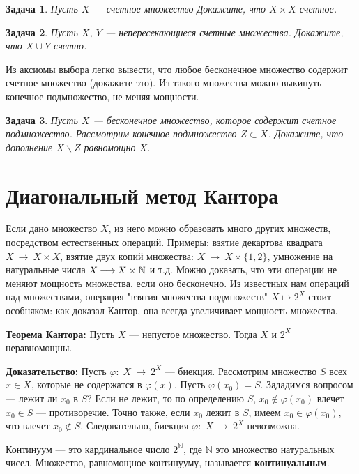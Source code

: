 \documentclass[12pt]{book}
\newcommand{\arrow}{{\:\longrightarrow\:}}
\def\endproof{\hbox{\vrule width 5pt height 5pt depth 0pt}}
\renewcommand{\phi}{\varphi}
\def\N{{\mathbb N}}
\theoremstyle{upshape}
\newtheorem{zadacha}{Задача}[chapter]
\theoremstyle{generic}
\newtheorem{remark}[teorema]{Замечание}
\def\замечание{\begin{remark}}
\def\еза{\end{remark}}
\theoremstyle{upshapenonumber}
\newcommand{\следствие}{%
     \refstepcounter{teorema}
     {\noindent\bf Следствие \thechapter.\arabic{teorema}:\ }}
\newcommand{\пример}{%
     \refstepcounter{teorema}
     {\noindent\bf Пример \thechapter.\arabic{teorema}:\ }}
\newcommand{\лемма}{%
     \refstepcounter{teorema}
     {\noindent\bf Лемма \thechapter.\arabic{teorema}:\ }}
\newcommand{\теорема}{%
     \refstepcounter{teorema}
     {\noindent\bf Теорема \thechapter.\arabic{teorema}:\ }}
\newcommand{\утверждение}{%
     \refstepcounter{teorema}
     {\noindent\bf Утверждение \thechapter.\arabic{teorema}:\ }}
\def\бф{\bf}
\def\ем{\em}
\def\задача{\begin{zadacha}}
\def\ез{\end{zadacha}}
\def\еу{\end{ukazanie}}
\def\ео{\end{opredelenie}}
\def\енум{\begin{enumerate}}
\def\ее{\end{enumerate}}
\begin{document}
\задача
Пусть $X$ --- счетное множество
Докажите, что $X\times X$ счетное. 
\ез

\задача
Пусть $X$, $Y$ --- непересекающиеся счетные
множества. Докажите, что $X\cup Y$ счетно.
\ез

Из аксиомы выбора легко вывести, 
что любое бесконечное множество содержит
счетное множество (докажите это). 
Из такого множества можно выкинуть
конечное подмножество, не меняя мощности.

\задача
Пусть $X$ --- бесконечное множество, которое
содержит счетное подмножество.
Рассмотрим конечное подмножество $Z\subset X$.
Докажите, что дополнение $X\backslash Z$
равномощно $X$. 
\ез



\section{Диагональный метод Кантора}

Если дано множество $X$, из него можно образовать
много других множеств, посредством естественных
операций. Примеры: взятие декартова квадрата
$X\arrow X\times X$, взятие двух копий множества:
$X \arrow X \times \{1,2\}$, умножение на натуральные
числа $X \arrow X \times {\Bbb N}$ и т.д.
Можно доказать, что эти операции не меняют
мощность множества, если оно бесконечно.
Из известных нам операций над множествами,
операция "взятия множества подмножеств" $X\mapsto 2^X$ стоит
особняком: как доказал Кантор, она всегда
увеличивает мощность множества.

\hfill

{\бф Теорема Кантора:}
Пусть $X$ --- непустое множество.
Тогда $X$ и $2^X$ неравномощны.

\hfill

{\бф Доказательство:}
Пусть $\phi:\; X \arrow 2^X$ --- биекция.
Рассмотрим множество $S$ всех $x\in X$, которые
не содержатся в $\phi(x)$. Пусть $\phi(x_0)=S$.
Зададимся вопросом --- лежит ли $x_0$ в $S$?
Если не лежит, то по определению $S$,
$x_0 \notin \phi(x_0)$ влечет $x_0\in S$ --- 
противоречие. Точно также, если 
$x_0$ лежит в $S$, имеем $x_0 \in \phi(x_0)$,
что влечет $x_0\notin S$. Следовательно,
биекция $\phi:\; X \arrow 2^X$ невозможна.
\endproof

\hfill

Континуум ---
это кардинальное число $2^\N$,
где $\N$ это множество натуральных чисел.
Множество, равномощное континууму, называется
{\бф континуальным}. 
\end{document}
